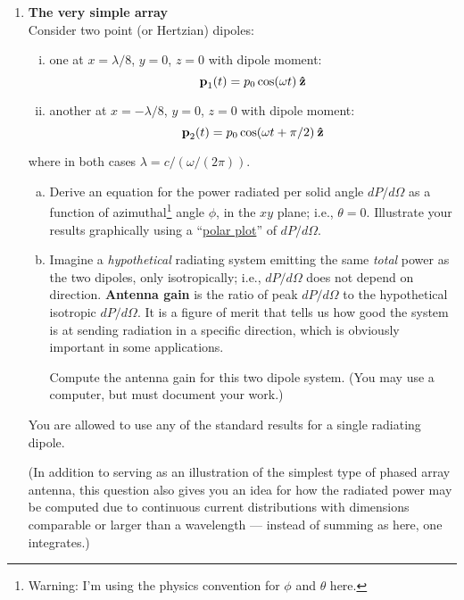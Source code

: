 \documentclass[12pt,geometry,width=8in]{article}
\begin{document}
\begin{enumerate}[(1),topsep=0pt,itemsep=0ex,partopsep=1ex,parsep=1ex]
\item \textbf{The very simple array}\\
Consider two point (or Hertzian) dipoles:
\begin{enumerate}[(i)]
\item one at $x=\lambda/8$, $y=0$, $z=0$ with dipole moment:
\begin{equation}
\boldsymbol{\mathbf{p}}_1(t) = p_0 \cos (\omega t) \: \boldsymbol{\mathbf{\hat{z}}}
\end{equation}
\item another at $x=-\lambda/8$, $y=0$, $z=0$ with dipole moment:
\begin{equation}
\boldsymbol{\mathbf{p}}_2(t) = p_0 \cos (\omega t + \pi/2) \: \boldsymbol{\mathbf{\hat{z}}}
\end{equation}
\end{enumerate}
where in both cases $\lambda = c/(\omega / (2\pi))$.

\begin{enumerate}[(a)]
\item Derive an equation for the power radiated per solid angle $dP/d\Omega$ as a function of azimuthal\footnote{Warning: I'm using the physics convention for $\phi$ and $\theta$ here.} angle $\phi$, in the $xy$ plane;  i.e., $\theta =0$.  Illustrate your results graphically using a  ``\href{https://matplotlib.org/3.1.0/gallery/pie_and_polar_charts/polar_demo.html}{polar plot}'' of $dP/d\Omega$.
\item Imagine a {\em hypothetical} radiating system emitting the same {\em total} power as the two dipoles, only isotropically; i.e., $dP/d\Omega$ does not depend on direction.  \textbf{Antenna gain} is the ratio of peak $dP/d\Omega$ to the hypothetical isotropic $dP/d\Omega$.  It is a figure of merit that tells us how good the system is at sending radiation in a specific direction, which is obviously important in some applications.

Compute the antenna gain for this two dipole system.  (You may use a computer, but must document your work.)
\end{enumerate}

You are allowed to use any of the standard results for a single radiating dipole.

(In addition to serving as an illustration of the simplest type of phased array antenna, this question also gives you an idea for how the radiated power may be computed due to continuous current distributions with dimensions comparable or larger than a wavelength --- instead of summing as here, one integrates.)


\end{enumerate}
\end{document}
